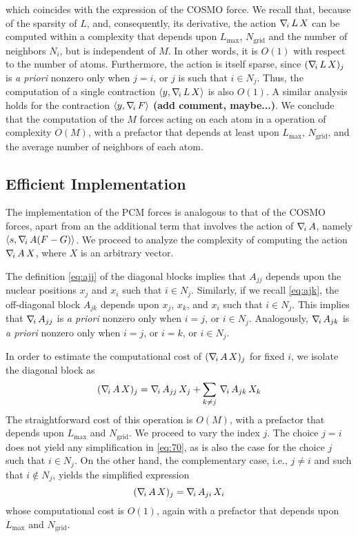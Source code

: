 which coincides with the expression of the COSMO force. We recall that, because of the sparsity of $L$, and, consequently, its derivative, the action $\nabla_{\!i}\, L \, X$ can be computed within a complexity that depends upon $L_\text{max}$, $N_\text{grid}$ and the number of neighbors $N_i$, but is independent of $M$. In other words, it is $O(1)$ with respect to the number of atoms. Furthermore, the action is itself sparse, since $(\nabla_{\!i}\, L \, X)_j$ is \emph{a priori} nonzero only when $j = i$, or $j$ is such that $i \in N_j$. Thus, the computation of a single contraction $\langle y , \nabla_{\!i}\, L \,  X \rangle$ is also $O(1)$. A similar analysis holds for the contraction $\langle y , \nabla_{\!i}\, F \rangle$ {\bf (add comment, maybe...)}. We conclude that the computation of the $M$ forces acting on each atom in a operation of complexity $O(M)$, with a prefactor that depends at least upon $L_\text{max}$, $N_\text{grid}$, and the average number of neighbors of each atom.

\subsection{Efficient Implementation}

The implementation of the PCM forces is analogous to that of the COSMO forces, apart from an the additional term that involves the action of $\nabla_{\!i}\, A$, namely $\langle s , \nabla_{\!i}\,  A ( F - G ) \rangle$. We proceed to analyze the complexity of computing the action $\nabla_{\!i}\, A \, X$, where $X$ is an arbitrary vector.

The definition \eqref{eq:ajj} of the diagonal blocks implies that $A_{jj}$ depends upon the nuclear positions $x_j$ and $x_i$ such that $i \in N_j$. Similarly, if we recall \eqref{eq:ajk}, the off-diagonal block $A_{jk}$ depends upon $x_j$, $x_k$, and $x_i$ such that $i \in N_j$. This implies that $\nabla_{\!i}\, A_{jj}$ is \emph{a priori} nonzero only when $i = j$, or $i \in N_j$. Analogously, $\nabla_{\!i}\, A_{jk}$ is \emph{a priori} nonzero only when $i = j$, or $i = k$, or $i \in N_j$.

In order to estimate the computational cost of $( \nabla_{\!i}\, A \, X)_j$ for fixed $i$, we isolate the diagonal block as
\begin{equation}\label{eq:70}
( \nabla_{\!i}\, A \, X)_j = \nabla_{\!i}\, A_{jj} \, X_j + \sum_{k\not=j} \,\nabla_{\!i}\, A_{jk} \, X_k
\end{equation}
The straightforward cost of this operation is $O(M)$, with a prefactor that depends upon $L_\text{max}$ and $N_\text{grid}$. We proceed to vary the index $j$. The choice $j = i$ does not yield any simplification in \eqref{eq:70}, as is also the case for the choice $j$ such that $i \in N_j$. On the other hand, the complementary case, i.e., $j \not=i$ and such that $i \not\in N_j$, yields the simplified expression
\[
( \nabla_{\!i}\, A \, X)_j = \nabla_{\!i}\, A_{ji} \, X_i
\]
whose computational cost is $O(1)$, again with a prefactor that depends upon $L_\text{max}$ and $N_\text{grid}$.

